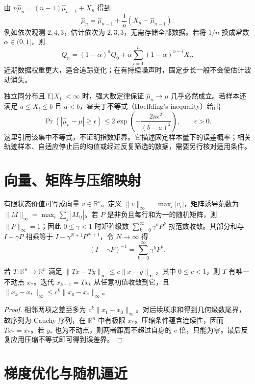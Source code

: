 由 $n\widehat\mu_n=(n-1)\widehat\mu_{n-1}+X_n$ 得到
\begin{equation}
\widehat\mu_n=\widehat\mu_{n-1}+\frac1n(X_n-\widehat\mu_{n-1}).
\label{eq:rl-incremental-mean}
\end{equation}
例如依次观测 $2,4,3$，估计依次为 $2,3,3$，无需存储全部数据。若将 $1/n$ 换成常数 $\alpha\in(0,1]$，则
\[
Q_n=(1-\alpha)^nQ_0+\alpha\sum_{i=1}^n(1-\alpha)^{n-i}X_i.
\]
近期数据权重更大，适合追踪变化；在有持续噪声时，固定步长一般不会使估计波动消失。

独立同分布且 $\mathbb E|X_1|<\infty$ 时，强大数定律保证 $\widehat\mu_n\to\mu$ 几乎必然成立。若样本还满足 $a\leq X_i\leq b$ 且 $a<b$，霍夫丁不等式（Hoeffding's inequality）\cite{hoeffding}给出
\[
\Pr(|\widehat\mu_n-\mu|\geq\epsilon)
\leq2\exp\!\left(-\frac{2n\epsilon^2}{(b-a)^2}\right),\qquad \epsilon>0.
\]
这里引用该集中不等式，不证明指数矩界。它描述固定样本量下的误差概率；相关轨迹样本、自适应停止后的均值或经过反复筛选的数据，需要另行核对适用条件。

\section{向量、矩阵与压缩映射}

有限状态价值可写成向量 $v\in\mathbb R^n$。定义 $\|v\|_\infty=\max_i|v_i|$，矩阵诱导范数为 $\|M\|_\infty=\max_i\sum_j|M_{ij}|$。若 $P$ 是非负且每行和为一的随机矩阵，则 $\|P\|_\infty=1$；因此 $0\leq\gamma<1$ 时矩阵级数 $\sum_{k=0}^\infty\gamma^kP^k$ 按范数收敛。其部分和与 $I-\gamma P$ 相乘等于 $I-\gamma^{N+1}P^{N+1}$，令 $N\to\infty$ 得
\begin{equation}
(I-\gamma P)^{-1}=\sum_{k=0}^\infty\gamma^kP^k.
\label{eq:rl-matrix-inverse}
\end{equation}

\begin{theorem}[有限维压缩映射]
若 $T:\mathbb R^n\to\mathbb R^n$ 满足 $\|Tx-Ty\|_\infty\leq c\|x-y\|_\infty$，其中 $0\leq c<1$，则 $T$ 有唯一不动点 $x_*$。迭代 $x_{k+1}=Tx_k$ 从任意初值收敛到它，且 $\|x_k-x_*\|_\infty\leq c^k\|x_0-x_*\|_\infty$。
\end{theorem}
\begin{proof}
相邻两项之差至多为 $c^k\|x_1-x_0\|_\infty$。对后续项求和得到几何级数尾界，故序列为 Cauchy 序列，在 $\mathbb R^n$ 中有极限 $x_*$。压缩条件蕴含连续性，因而 $Tx_*=x_*$。若 $y_*$ 也为不动点，则两者距离不超过自身的 $c$ 倍，只能为零。最后反复应用压缩不等式即可得到误差界。
\end{proof}

\section{梯度优化与随机逼近}

